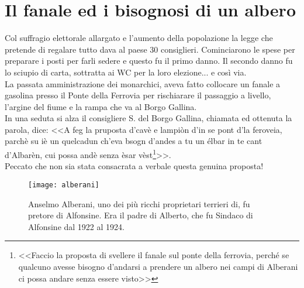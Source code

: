 
\chapter{Il fanale ed i bisognosi di un albero}
Col suffragio elettorale allargato e l'aumento della popolazione la legge che pretende di regalare tutto dava al paese 30 consiglieri. Cominciarono le spese per preparare i posti per farli sedere e questo fu il primo danno. Il secondo danno fu lo sciupio di carta, sottratta ai WC per la loro elezione... e così via.\\
\indent La passata amministrazione dei monarchici, aveva fatto collocare un fanale a gasolina presso il Ponte della Ferrovia per rischiarare il passaggio a livello, l'argine del fiume e la rampa che va al Borgo Gallina.\\
\indent In una seduta si alza il consigliere S.\: \: del Borgo Gallina, chiamata ed ottenuta la parola, dice: <<A feg la pruposta d'cavè e lampiòn d'in se pont d'la feroveia, parchè su iè un quelcadun ch'eva bsogn d'andes a tu un élbar in te cant d'Albarèn, cui possa andè senza èsar vèst\footnote{<<Faccio la proposta di svellere il fanale sul ponte della ferrovia, perché se qualcuno avesse bisogno d'andarsi a prendere un albero nei campi di Alberani ci possa andare senza essere visto>>}>>.\\
\indent Peccato che non sia stata consacrata a verbale questa genuina proposta!

 \begin{figure}[htb]
    \centering
    \texttt{[image: alberani]}
    \caption*{Anselmo Alberani, uno dei più ricchi proprietari terrieri di, fu pretore di Alfonsine. Era il padre di Alberto, che fu Sindaco di Alfonsine dal 1922 al 1924.\label{fig:alberani}}
\end{figure}